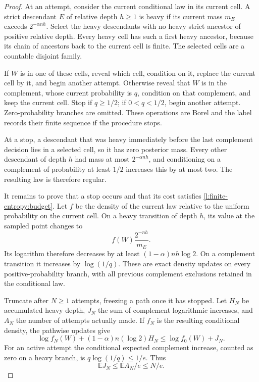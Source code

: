 \begin{proof}
At an attempt, consider the current conditional law in its current
cell.  A strict descendant \(E\) of relative depth \(h\ge1\) is
heavy if its current mass \(m_E\) exceeds \(2^{-\alpha nh}\).
Select the heavy descendants with no heavy strict ancestor of positive
relative depth.  Every heavy cell has such a first heavy ancestor,
because its chain of ancestors back to the current cell is finite.
The selected cells are a countable disjoint family.

If \(W\) is in one of these cells, reveal which cell, condition on
it, replace the current cell by it, and begin another attempt.
Otherwise reveal that \(W\) is in the complement, whose current
probability is \(q\), condition on that complement, and keep the
current cell.  Stop if \(q\ge1/2\); if \(0<q<1/2\), begin another
attempt.  Zero-probability branches are omitted.  These operations
are Borel and the label records their finite sequence if the procedure
stops.

At a stop, a descendant that was heavy immediately before the last
complement decision lies in a selected cell, so it has zero posterior
mass.  Every other descendant of depth \(h\) had mass at most
\(2^{-\alpha nh}\), and conditioning on a complement of probability
at least \(1/2\) increases this by at most two.  The resulting law
is therefore regular.

It remains to prove that a stop occurs and that its cost satisfies
\eqref{l:finite-entropy:budget}.  Let \(f\) be the density of the
current law relative to the uniform probability on the current cell.
On a heavy transition of depth \(h\), its value at the sampled point
changes to
\[
 f(W)\frac{2^{-nh}}{m_E}.
\]
Its logarithm therefore decreases by at least
\((1-\alpha)nh\log2\).  On a complement transition it increases
by \(\log(1/q)\).  These are exact density updates on every
positive-probability branch, with all previous complement exclusions
retained in the conditional law.

Truncate after \(N\ge1\) attempts, freezing a path once it has stopped.
Let \(H_N\) be accumulated heavy depth, \(J_N\) the sum of complement
logarithmic increases, and \(A_N\) the number of attempts actually made.
If \(f_N\) is the resulting conditional density, the pathwise updates
give
\begin{equation}\label{l:finite-entropy:path}
 \log f_N(W)+(1-\alpha)n(\log2)H_N
 \le\log f_0(W)+J_N.
\end{equation}
For an active attempt the conditional expected complement increase,
counted as zero on a heavy branch, is \(q\log(1/q)\le1/e\).
Thus
\[
 \mathbb EJ_N\le \mathbb EA_N/e\le N/e.
\]


\end{proof}
